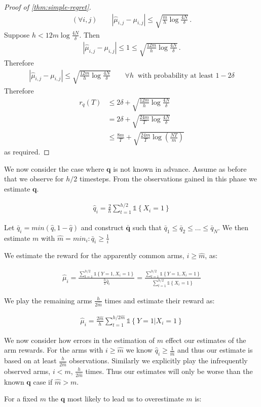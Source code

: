 \documentclass{article}
\newcommand{\todot}[2][]{\todo[color=red!20!white,#1]{#2}}
\newcommand{\set}[1]{\left\{#1\right\}}
\newcommand{\ind}[1]{\mathds{1}\!\!\set{#1}}
\newcommand{\eqn}[1]{\begin{align}#1\end{align}}
\newcommand{\eq}[1]{\begin{align*}#1\end{align*}}
\theoremstyle{plain}
\theoremstyle{definition}
\begin{document}
\begin{proof}[Proof of \cref{thm:simple-regret}]
\eq{
(\forall i, j) \qquad \left|\hat \mu_{i,j} - \mu_{i,j}\right| \leq \sqrt{\frac{m}{h} \log\frac{4N}{\delta}}\,.
}
Suppose $h < 12m \log \frac{4N}{\delta}$. Then
\eq{
\left|\hat \mu_{i,j} - \mu_{i,j}\right| \leq 1 \leq \sqrt{\frac{12m}{h} \log \frac{4N}{\delta}}\,.
}
Therefore
\eq{
\left|\hat \mu_{i,j} - \mu_{i,j}\right| \leq \sqrt{\frac{12m}{h} \log \frac{4N}{\delta}} \qquad \forall h\ \text{ with probability at least } 1-2\delta
}
Therefore 
\eq{
r_q(T) 
&\leq 2\delta + \sqrt{\frac{12m}{h} \log \frac{4N}{\delta}} \\
&= 2\delta + \sqrt{\frac{24m}{T} \log \frac{4N}{\delta}} \\
&\leq \frac{8m}{T} + \sqrt{\frac{24m}{T} \log \left(\frac{NT}{m}\right)}
}
as required.
\end{proof}





We now consider the case where $\boldsymbol{q}$ is not known in advance. Assume as before that we observe for $h/2$ timesteps. From the observations gained in this phase we estimate $\boldsymbol{q}$.

\eqn{
\hat{q}_i = \frac{2}{h}\sum_{t=1}^{h/2}\ind{X_i=1}
}

Let $\bar{q}_i = min(\hat{q},1-\hat{q})$ and construct $\bar{\boldsymbol{q}}$ such that $\bar{q}_1 \leq \bar{q}_2 \leq ...\leq \bar{q}_N$. We then estimate $m$ with $\hat{m} = min_i : \bar{q}_i \geq \frac{1}{i}$  

We estimate the reward for the apparently common arms, $i \geq \hat{m}$, as:

\eqn{
\hat{\mu}_i = \frac{\sum_{t=1}^{h/2}\ind{Y = 1,X_i = 1}}{\frac{h}{2}\hat{q}_i} = \frac{\sum_{t=1}^{h/2}\ind{Y = 1,X_i = 1}}{\sum_{t=1}^{h/2}\ind{X_i=1}}
}

We play the remaining arms $\frac{h}{2\hat{m}}$ times and estimate their reward as:

\eqn{
\hat{\mu}_i = \frac{2\hat{m}}{h}\sum_{t=1}^{h/2\hat{m}}\ind{Y = 1|X_i=1}
}

We now consider how errors in the estimation of $m$ effect our estimates of the arm rewards. For the arms with $i \geq \hat{m}$ we know $\hat{q}_i \geq \frac{1}{\hat{m}}$ and thus our estimate is based on at least $\frac{h}{2\hat{m}}$ observations. Similarly we explicitly play the infrequently observed arms, $i < m$,  $\frac{h}{2\hat{m}}$ times. Thus our estimates will only be worse than the known $\boldsymbol{q}$ case if $\hat{m} > m$. 

For a fixed $m$ the $\boldsymbol{q}$ most likely to lead us to overestimate $m$ is: \todot{Justify this claim.}
\end{document}
